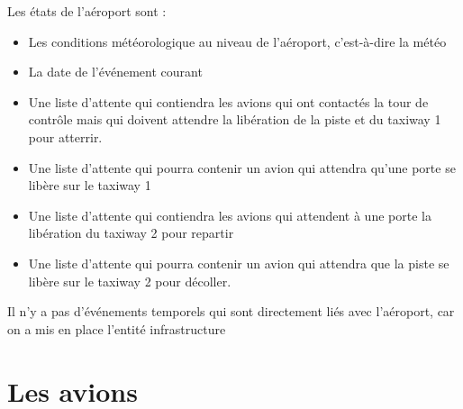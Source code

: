 Les états de l'aéroport sont :
\begin{itemize}[label=--]
\item Les conditions météorologique au niveau de l'aéroport, c'est-à-dire la météo
\item La date de l'événement courant
\item Une liste d'attente qui contiendra les avions qui ont contactés la tour de contrôle mais qui doivent attendre la libération de la piste et du taxiway 1 pour atterrir.
\item Une liste d'attente qui pourra contenir un avion qui attendra qu'une porte se libère sur le taxiway 1
\item Une liste d'attente qui contiendra les avions qui attendent à une porte la libération du taxiway 2 pour repartir
\item Une liste d'attente qui pourra contenir un avion qui attendra que la piste se libère sur le taxiway 2 pour décoller.
\end{itemize}

Il n'y a pas d'événements temporels qui sont directement liés avec l'aéroport, car on a mis en place l'entité infrastructure
\section{Les avions}

